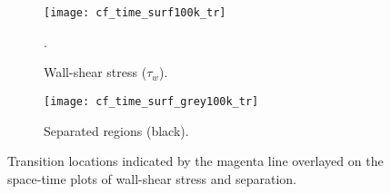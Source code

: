 \begin{figure}[h]
	\centering
	\begin{subfigure}[t]{0.46\textwidth}
		\centering
		\texttt{[image: cf\_time\_surf100k\_tr]}
		\caption{Wall-shear stress ($\tau_{w}$).}. 
		\label{fig:cf-time_tr}
	\end{subfigure}
	\begin{subfigure}[t]{0.45\textwidth}
		\centering
		\texttt{[image: cf\_time\_surf\_grey100k\_tr]}
		\caption{Separated regions (black).} 
		\label{fig:separation-time_tr}
	\end{subfigure}
	\caption{Transition locations indicated by the magenta line overlayed on the space-time plots of wall-shear stress and separation.}
	\label{fig:space-time_tr}
\end{figure}


